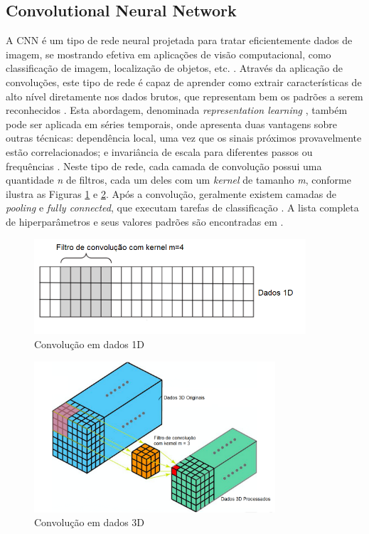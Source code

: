 \subsection{Convolutional Neural Network}

A CNN é um tipo de rede neural projetada para tratar eficientemente dados de imagem, se mostrando efetiva em aplicações de visão computacional, como classificação de imagem, localização de objetos, etc. \cite{Brownlee2018}. Através da aplicação de convoluções, este tipo de rede é capaz de aprender como extrair características de alto nível diretamente nos dados brutos, que representam bem os padrões a serem reconhecidos \cite{Dixon2019,Goodfellow2016}. Esta abordagem, denominada \textit{representation learning} \cite{Brownlee2018}, também pode ser aplicada em séries temporais, onde apresenta duas vantagens sobre outras técnicas: dependência local, uma vez que os sinais próximos provavelmente estão correlacionados; e invariância de escala para diferentes passos ou frequências \cite{Wang2019}. Neste tipo de rede, cada camada de convolução possui uma quantidade \emph{n} de filtros, cada um deles com um \textit{kernel} de tamanho \emph{m}, conforme ilustra as Figuras \ref{fig:cnn_convolution} e \ref{fig:cnn_convolution_3d}. Após a convolução, geralmente existem camadas de \textit{pooling} e \textit{fully connected}, que executam tarefas de classificação \cite{Wang2019}. A lista completa de hiperparâmetros e seus valores padrões são encontradas em .

\begin{figure}[h]
  \centering
  \caption{Convolução em dados 1D}
   \label{fig:cnn_convolution}
   \includegraphics[width=0.9\textwidth]{figuras/fig_11.png}
\end{figure}

\begin{figure}[h]
  \centering
  \caption{Convolução em dados 3D}
   \label{fig:cnn_convolution_3d}
   \includegraphics[width=0.8\textwidth]{figuras/fig_12.png}
\end{figure}

